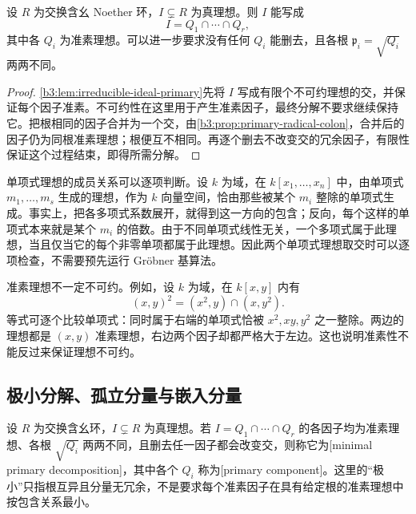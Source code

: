 \begin{theorem}[准素分解存在性]\label{b3:thm:primary-decomposition}
	设 \(R\) 为交换含幺 Noether 环，\(I\subsetneq R\) 为真理想。则 \(I\) 能写成
	\begin{equation}\label{b3:eq:primary-decomposition}
		I=Q_1\cap\cdots\cap Q_r,
	\end{equation}
	其中各 \(Q_i\) 为准素理想。可以进一步要求没有任何 \(Q_i\) 能删去，且各根 \(\mathfrak p_i=\sqrt{Q_i}\) 两两不同。
\end{theorem}
\begin{proof}
	\cref{b3:lem:irreducible-ideal-primary}先将 \(I\) 写成有限个不可约理想的交，并保证每个因子准素。不可约性在这里用于产生准素因子，最终分解不要求继续保持它。把根相同的因子合并为一个交，由\cref{b3:prop:primary-radical-colon}，合并后的因子仍为同根准素理想；根便互不相同。再逐个删去不改变交的冗余因子，有限性保证这个过程结束，即得所需分解。
\end{proof}

单项式理想的成员关系可以逐项判断。设 \(k\) 为域，在 \(k[x_1,\ldots,x_n]\) 中，由单项式 \(m_1,\ldots,m_s\) 生成的理想，作为 \(k\) 向量空间，恰由那些被某个 \(m_i\) 整除的单项式生成。事实上，把各多项式系数展开，就得到这一方向的包含；反向，每个这样的单项式本来就是某个 \(m_i\) 的倍数。由于不同单项式线性无关，一个多项式属于此理想，当且仅当它的每个非零单项都属于此理想。因此两个单项式理想取交时可以逐项检查，不需要预先运行 Gröbner 基算法。

\ProseParagraphBreak
准素理想不一定不可约。例如，设 \(k\) 为域，在 \(k[x,y]\) 内有
\[
	(x,y)^2=(x^2,y)\cap(x,y^2).
\]
等式可逐个比较单项式：同时属于右端的单项式恰被 \(x^2,xy,y^2\) 之一整除。两边的理想都是 \((x,y)\) 准素理想，右边两个因子却都严格大于左边。这也说明准素性不能反过来保证理想不可约。

\subsection{极小分解、孤立分量与嵌入分量}
\label{b3:subsec:0403:02}

设 \(R\) 为交换含幺环，\(I\subsetneq R\) 为真理想。若 \(I=Q_1\cap\cdots\cap Q_r\) 的各因子均为准素理想、各根 \(\sqrt{Q_i}\) 两两不同，且删去任一因子都会改变交，则称它为[minimal primary decomposition]，其中各个 \(Q_i\) 称为[primary component]。这里的“极小”只指根互异且分量无冗余，不是要求每个准素因子在具有给定根的准素理想中按包含关系最小。

